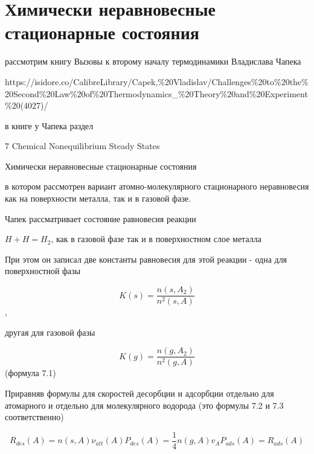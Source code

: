 \documentclass[11pt]{article}
\makeatletter
\newcommand{\boxspacing}{\kern\kvtcb@left@rule\kern\kvtcb@boxsep}
\newcommand{\prompt}[4]{
        {\ttfamily\llap{{\color{#2}[#3]:\hspace{3pt}#4}}\vspace{-\baselineskip}}
    }
\makeatother
\begin{document}
    \begin{tcolorbox}[breakable, size=fbox, boxrule=1pt, pad at break*=1mm,colback=cellbackground, colframe=cellborder]
\prompt{In}{incolor}{ }{\boxspacing}
\begin{Verbatim}[commandchars=\\\{\}]

\end{Verbatim}
\end{tcolorbox}

    \section{Химически неравновесные стационарные
состояния}\label{ux445ux438ux43cux438ux447ux435ux441ux43aux438-ux43dux435ux440ux430ux432ux43dux43eux432ux435ux441ux43dux44bux435-ux441ux442ux430ux446ux438ux43eux43dux430ux440ux43dux44bux435-ux441ux43eux441ux442ux43eux44fux43dux438ux44f}

рассмотрим книгу Вызовы к второму началу термодинамики Владислава Чапека

https://isidore.co/CalibreLibrary/Capek,\%20Vladislav/Challenges\%20to\%20the\%20Second\%20Law\%20of\%20Thermodynamics\_\%20Theory\%20and\%20Experiment\%20(4027)/

    в книге у Чапека раздел

7 Chemical Nonequilibrium Steady States

Химически неравновесные стационарные состояния

в котором рассмотрен вариант атомно-молекулярного стационарного
неравновесия как на поверхности металла, так и в газовой фазе.

Чапек рассматривает состояние равновесия реакции

\(H + H = H_2\), как в газовой фазе так и в поверхностном слое металла

При этом он записал две константы равновесия для этой реакции - одна для
поверхностной фазы

\[K(s) = \frac{n(s, A_2)}{n^2(s, A)}\],

другая для газовой фазы

\[K(g) = \frac{n(g, A_2)}{n^2(g, A)}\] (формула 7.1)

Приравняв формулы для скоростей десорбции и адсорбции отдельно для
атомарного и отдельно для молекулярного водорода (это формулы 7.2 и 7.3
соответственно)

\[R_{des} (A) = n(s, A) \nu_{att}(A) P_{des}(A)=\frac{1}{4} n(g, A) v_{A} P_{ads}(A) = R_{ads}(A)\]
\end{document}
